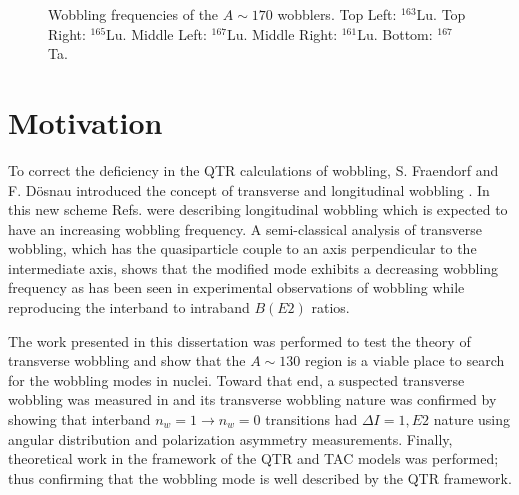\begin{figure}[ht!]
	\caption{Wobbling frequencies of the $A\sim{}170$ wobblers. Top Left: $^{163}$Lu. Top Right: $^{165}$Lu. Middle Left: $^{167}$Lu. Middle Right: $^{161}$Lu. Bottom: $^{167}$Ta.\label{fig:chp1-old-wobb-freq}}
\end{figure}

\section{Motivation}
\label{ssec:intro-rot-motivation}
To correct the deficiency in the QTR calculations of wobbling, S. Fraendorf and F. D\"{o}snau introduced the concept of transverse and longitudinal wobbling \cite{frauendorfTransverseWobbling}. In this new scheme Refs. \cite{oldQTRWobblingTheory1,oldQTRWobblingTheory2,oldQTRWobblingTheory3,oldQTRWobblingTheory4} were describing longitudinal wobbling which is expected to have an increasing wobbling frequency. A semi-classical analysis of transverse wobbling, which has the quasiparticle couple to an axis perpendicular to the intermediate axis, shows that the modified mode exhibits a decreasing wobbling frequency as has been seen in experimental observations of wobbling while reproducing the interband to intraband $B(E2)$ ratios.

The work presented in this dissertation was performed to test the theory of transverse wobbling and show that the $A\sim{}130$ region is a viable place to search for the wobbling modes in nuclei. Toward that end, a suspected transverse wobbling was measured in \pr{} and its transverse wobbling nature was confirmed by showing that interband $n_w=1\rightarrow{}n_w=0$ transitions had $\Delta{}I=1, E2$ nature using angular distribution and polarization asymmetry measurements. Finally, theoretical work in the framework of the QTR and TAC models was performed; thus confirming that the wobbling mode is well described by the QTR framework.
